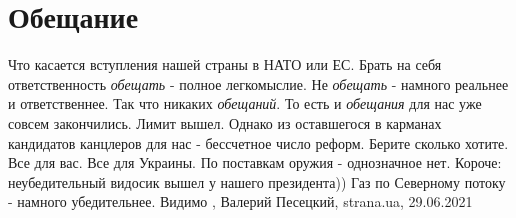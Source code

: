  
 
 
 
 
\chapter{Обещание}
\label{sec:slova.obeschanie}

Что касается вступления нашей страны в НАТО или ЕС. Брать на себя
ответственность \emph{обещать} - полное легкомыслие. Не \emph{обещать} - намного реальнее и
ответственнее. Так что никаких \emph{обещаний}. То есть и \emph{обещания} для нас уже совсем
закончились. Лимит вышел. Однако из оставшегося в карманах кандидатов канцлеров
для нас - бессчетное число реформ. Берите сколько хотите. Все для вас. Все для
Украины. По поставкам оружия - однозначное нет. Короче: неубедительный
видосик вышел у нашего президента)) Газ по Северному потоку - намного
убедительнее. Видимо
, 
Валерий Песецкий, strana.ua, 29.06.2021

